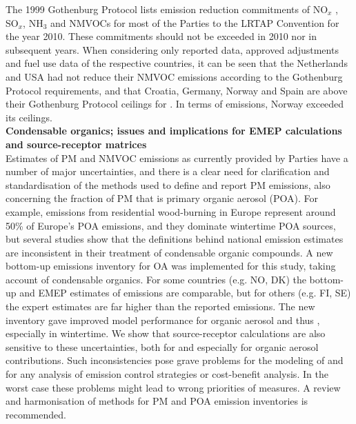 The 1999 Gothenburg Protocol lists emission reduction commitments of NO$_x$ ,
SO$_x$, NH$_3$  and NMVOCs for most of the Parties to the LRTAP Convention for the year 2010. These commitments should not be exceeded in 2010 nor in subsequent years.
When considering only reported data, approved adjustments and fuel use data of the respective countries, it can be seen that the Netherlands and USA had not reduce their NMVOC emissions according to the Gothenburg Protocol requirements, and that Croatia, Germany, Norway and Spain are above their Gothenburg Protocol ceilings for \nhiii. In terms of \nox emissions, Norway exceeded its ceilings.\\



\noindent
\textbf{Condensable organics; issues and implications for EMEP calculations and source-receptor matrices}\\
Estimates of PM and NMVOC emissions as currently provided by Parties have a number
of major uncertainties, and there is a clear need for clarification and
standardisation of the methods used to define and report PM emissions,
also concerning the fraction of PM that is primary organic aerosol (POA).
For example, emissions from residential wood-burning in Europe represent
around 50\% of Europe's POA emissions, and they dominate wintertime POA
sources, but several studies show that the definitions behind national
emission estimates are inconsistent in their treatment of condensable
organic compounds.  A new bottom-up emissions inventory for OA was
implemented for this study, taking account of condensable organics.
For some countries (e.g. NO, DK) the bottom-up and EMEP estimates of
\pmfine emissions are comparable, but for others (e.g. FI, SE) the expert
estimates are far higher than the reported emissions.  The new inventory
gave improved model performance for organic aerosol and thus \pmfine,
especially in wintertime.  We show that source-receptor calculations
are also sensitive to these uncertainties, both for \pmfine and
especially for organic aerosol contributions.  Such inconsistencies
pose grave problems for the modeling of \pmfine  and for any analysis of
emission control strategies or cost-benefit analysis. In the worst case
these problems might lead to wrong priorities of measures.  A review
and harmonisation of methods for PM and POA emission inventories is
recommended.\\


